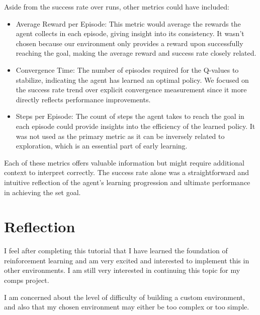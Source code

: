\documentclass[10pt,twocolumn]{article}
\begin{document}
    Aside from the success rate over runs, other metrics could have included:
    \begin{itemize}
        \item Average Reward per Episode: This metric would average the rewards the agent collects in each episode, giving insight into its consistency. It wasn't chosen because our environment only provides a reward upon successfully reaching the goal, making the average reward and success rate closely related.
        \item Convergence Time: The number of episodes required for the Q-values to stabilize, indicating the agent has learned an optimal policy. We focused on the success rate trend over explicit convergence measurement since it more directly reflects performance improvements.
        \item Steps per Episode: The count of steps the agent takes to reach the goal in each episode could provide insights into the efficiency of the learned policy. It was not used as the primary metric as it can be inversely related to exploration, which is an essential part of early learning.
    \end{itemize}

    Each of these metrics offers valuable information but might require additional context to interpret correctly. The success rate alone was a straightforward and intuitive reflection of the agent's learning progression and ultimate performance in achieving the set goal.


\section{Reflection}
    I feel after completing this tutorial that I have learned the foundation of reinforcement learning and am very excited and interested to implement this in other environments. I am still very interested in continuing this topic for my comps project. 
    
    I am concerned about the level of difficulty of building a custom environment, and also that my chosen environment may either be too complex or too simple.
\printbibliography
\end{document}
